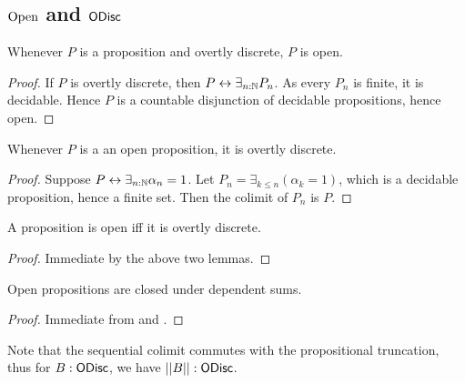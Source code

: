 \subsection{$\mathrm{Open}$ and $\mathsf{ODisc}$} %
\begin{lemma}
  Whenever $P$ is a proposition and overtly discrete, $P$ is open. 
\end{lemma}
\begin{proof}
  If $P$ is overtly discrete, then $P\leftrightarrow \exists_{n:\mathbb{N}} P_n$. 
  As every $P_n$ is finite, it is decidable. 
  Hence $P$ is a countable disjunction of decidable propositions, hence open.%
\end{proof}
\begin{lemma}
  Whenever $P$ is a an open proposition, it is overtly discrete.
\end{lemma}
\begin{proof}
  Suppose $P\leftrightarrow \exists_{n:\mathbb{N}} \alpha_n = 1$. 
  Let $P_n = \exists_{k\leq n} (\alpha_k = 1)$, which is a decidable proposition, hence a finite set. 
  Then the colimit of $P_n$ is $P$. 
\end{proof} 
\begin{corollary}\label{PropOpenIffOdisc}
  A proposition is open iff it is overtly discrete.
\end{corollary}
\begin{proof}
  Immediate by the above two lemmas. 
\end{proof}
\begin{corollary}\label{OpenDependentSums}
  Open propositions are closed under dependent sums. 
\end{corollary}
\begin{proof}
  Immediate from  and .
\end{proof}
\begin{remark}
  Note that the sequential colimit commutes with the propositional truncation, thus for $B:\mathsf{ODisc}$, we have 
  $||B||:\mathsf{ODisc}$. 
\end{remark}

